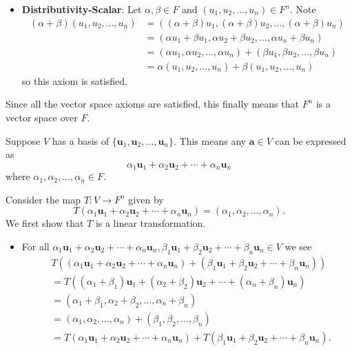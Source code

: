 \begin{questions}
\begin{itemize}
        \item \textbf{Distributivity-Scalar}: Let $\alpha, \beta \in F$ and $(u_1, u_2, \dots, u_n) \in F^n$. Note
        \begin{align*}
            (\alpha+\beta)(u_1, u_2, \dots, u_n) &= ((\alpha+\beta)u_1, (\alpha+\beta)u_2, \dots, (\alpha+\beta)u_n)\\
            &= (\alpha u_1 + \beta u_1, \alpha u_2 + \beta u_2, \dots, \alpha u_n + \beta u_n)\\
            &= (\alpha u_1, \alpha u_2, \dots, \alpha u_n) + (\beta u_1, \beta u_2, \dots, \beta u_n)\\
            &= \alpha(u_1, u_2, \dots, u_n) + \beta(u_1, u_2, \dots, u_n)
        \end{align*}
        so this axiom is satisfied.
    \end{itemize}
    Since all the vector space axioms are satisfied, this finally means that $F^n$ is a vector space over $F$.

    \item Suppose $V$ has a basis of $\{\textbf{u}_1, \textbf{u}_2, \dots, \textbf{u}_n\}$. This means any $\textbf{a} \in V$ can be expressed as
    \[
        \alpha_1\textbf{u}_1 + \alpha_2\textbf{u}_2 + \cdots + \alpha_n\textbf{u}_n
    \]
    where $\alpha_1,\alpha_2,\dots,\alpha_n \in F$.

    Consider the map $T: V \to F^n$ given by
    \[
        T( \alpha_1\textbf{u}_1 + \alpha_2\textbf{u}_2 + \cdots + \alpha_n\textbf{u}_n) = (\alpha_1, \alpha_2, \dots, \alpha_n).
    \]
    We first show that $T$ is a linear transformation.
    \begin{itemize}
        \item For all $\alpha_1\textbf{u}_1 + \alpha_2\textbf{u}_2 + \cdots + \alpha_n\textbf{u}_n, \beta_1\textbf{u}_1 + \beta_2\textbf{u}_2 + \cdots + \beta_n\textbf{u}_n \in V$ we see
        \begin{align*}
            &T((\alpha_1\textbf{u}_1 + \alpha_2\textbf{u}_2 + \cdots + \alpha_n\textbf{u}_n) + (\beta_1\textbf{u}_1 + \beta_2\textbf{u}_2 + \cdots + \beta_n\textbf{u}_n))\\
            &= T((\alpha_1 + \beta_1)\textbf{u}_1 + (\alpha_2 + \beta_2)\textbf{u}_2 + \cdots + (\alpha_n + \beta_n)\textbf{u}_n)\\
            &= (\alpha_1 + \beta_1, \alpha_2 + \beta_2, \dots, \alpha_n + \beta_n)\\
            &= (\alpha_1, \alpha_2, \dots, \alpha_n) + (\beta_1, \beta_2, \dots, \beta_n)\\
            &= T(\alpha_1\textbf{u}_1 + \alpha_2\textbf{u}_2 + \cdots + \alpha_n\textbf{u}_n) + T(\beta_1\textbf{u}_1 + \beta_2\textbf{u}_2 + \cdots + \beta_n\textbf{u}_n).
        \end{align*}


\end{itemize}
\end{questions}
